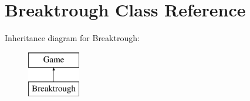 \hypertarget{class_breaktrough}{\section{Breaktrough Class Reference}
\label{class_breaktrough}
}
Inheritance diagram for Breaktrough\-:\begin{figure}[H]
\begin{center}
\leavevmode
\includegraphics[height=2.000000cm]{class_breaktrough}
\end{center}
\end{figure}
